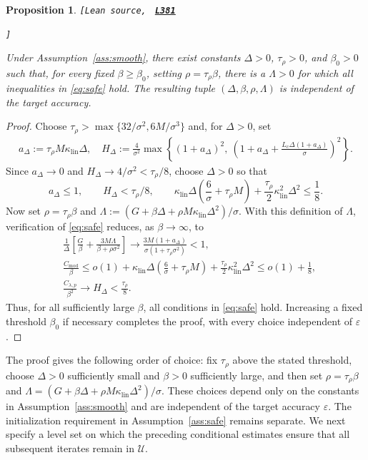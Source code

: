 \documentclass[11pt]{article}
\newtheorem{proposition}[theorem]{Proposition}
\theoremstyle{definition}
\theoremstyle{remark}
\numberwithin{equation}{section}
\numberwithin{figure}{section}
\numberwithin{table}{section}
\numberwithin{algorithm}{section}
\newcommand{\eps}{\varepsilon}
\newcommand{\leanLinkText}[1]{%
  \underline{\textbf{#1}}%
}
\newcommand{\leanDeclTag}[2]{%
  {\footnotesize\texttt{[Lean source, }}%
  \href{https://github.com/optpku/ReasBook/blob/v4.32.2/ReasBook/Papers/TR_LALM_theory/#1?plain=1\#L#2}%
    {\leanLinkText{\footnotesize\texttt{L#2}}}%
}
\newcommand{\leanDeclTagEnd}{%
  \unskip
  {\footnotesize\texttt{]}}\enspace
}
\begin{document}
\begin{proposition}
\label{prop:existence}
\leanDeclTag{Proposition_2_4.lean}{381}
\leanDeclTagEnd
Under Assumption~\ref{ass:smooth}, there exist constants
$\Delta>0$, $\tau_\rho>0$, and $\beta_0>0$ such that, for every fixed $\beta\ge\beta_0$, setting $\rho=\tau_\rho\beta$, there is a
$\Lambda>0$ for which all inequalities in \eqref{eq:safe} hold.
The resulting tuple $(\Delta,\beta,\rho,\Lambda)$ is independent of the target accuracy.
\end{proposition}

\begin{proof}
Choose
\(\tau_\rho>\max\{32/\sigma^2,6M/\sigma^3\}\) and, for
\(\Delta>0\), set
\begin{align*}
a_\Delta:=\tau_\rho M\kappa_{\mathrm{lin}}\Delta,\quad
H_\Delta:=\frac4{\sigma^2}
\max\left\{
(1+a_\Delta)^2,\
\left(1+a_\Delta+
\frac{L_c\Delta(1+a_\Delta)}{\sigma}\right)^2
\right\}.
\end{align*}
Since \(a_\Delta\to0\) and
\(H_\Delta\to4/\sigma^2<\tau_\rho/8\), choose \(\Delta>0\) so that
\begin{equation}
 a_\Delta\le1,\qquad H_\Delta<\tau_\rho/8,\qquad
 \kappa_{\mathrm{lin}}\Delta
 \left(\frac6\sigma+\tau_\rho M\right)
 +\frac{\tau_\rho}{2}\kappa_{\mathrm{lin}}^2\Delta^2
 \le\frac18.
    \label{eq:delta-choice}
\end{equation}
Now set \(\rho=\tau_\rho\beta\) and
\(\Lambda:=(G+\beta\Delta+\rho M\kappa_{\mathrm{lin}}\Delta^2)/\sigma\).
With this definition of \(\Lambda\), verification of \eqref{eq:safe}
reduces, as \(\beta\to\infty\), to
\begin{align*}
 &\frac1\Delta\left[
 \frac G\beta+\frac{3M\Lambda}{\beta+\rho\sigma^2}\right]
 \longrightarrow
 \frac{3M(1+a_\Delta)}{\sigma(1+\tau_\rho\sigma^2)}
 <1,\\
 &\frac{C_{\mathrm{mod}}}{\beta}
 \le o(1)+\kappa_{\mathrm{lin}}\Delta
 \left(\frac6\sigma+\tau_\rho M\right)
 +\frac{\tau_\rho}{2}\kappa_{\mathrm{lin}}^2\Delta^2
 \le o(1)+\frac18,\\
 &\frac{C_{\lambda,p}}{\beta^2}
 \longrightarrow H_\Delta<\frac{\tau_\rho}{8}.
\end{align*}
Thus, for all sufficiently large \(\beta\), all conditions in \eqref{eq:safe} hold.  Increasing a fixed threshold \(\beta_0\) if necessary completes the proof, with every choice independent of \(\eps\).
\end{proof}

The proof gives the following order of choice: fix $\tau_\rho$ above the stated threshold, choose $\Delta>0$ sufficiently small and $\beta>0$ sufficiently large, and then set $\rho=\tau_\rho\beta$ and $\Lambda=(G+\beta\Delta+\rho M\kappa_{\mathrm{lin}}\Delta^2)/\sigma$. These choices depend only on the constants in Assumption~\ref{ass:smooth} and are independent of the target accuracy $\eps$.  The initialization requirement in Assumption~\ref{ass:safe} remains separate.  We next specify a level set on which the preceding conditional estimates ensure that all subsequent iterates remain in $\mathcal U$.
\end{document}
